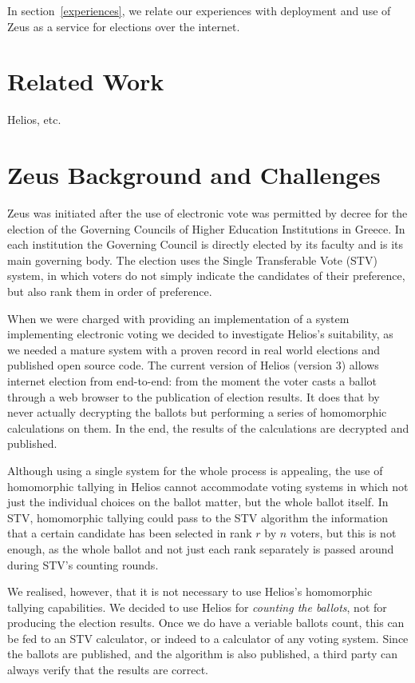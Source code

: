 \documentclass[letterpaper,twocolumn,10pt]{article}
\begin{document}
In section~\ref{experiences},
we relate our experiences with deployment and use of Zeus as a service
for elections over the internet.

\section{Related Work}
\label{related}

Helios, etc.

\section{Zeus Background and Challenges}
\label{challenges}
Zeus was initiated after the use of electronic vote was permitted by
decree for the election of the Governing Councils of Higher Education
Institutions in Greece. In each institution the Governing Council is
directly elected by its faculty and is its main governing body. The
election uses the Single Transferable Vote (STV) system, in which
voters do not simply indicate the candidates of their preference, but
also rank them in order of preference. 

When we were charged with providing an implementation of a system
implementing electronic voting we decided to investigate Helios's
suitability, as we needed a mature system with a proven record in real
world elections and published open source code. The current version of
Helios (version 3) allows internet election from end-to-end: from the
moment the voter casts a ballot through a web browser to the
publication of election results. It does that by never actually
decrypting the ballots but performing a series of homomorphic
calculations on them. In the end, the results of the calculations are
decrypted and published. 

Although using a single system for the whole process is appealing, the
use of homomorphic tallying in Helios cannot accommodate voting
systems in which not just the individual choices on the ballot matter,
but the whole ballot itself. In STV, homomorphic tallying could pass
to the STV algorithm the information that a certain candidate has been
selected in rank $r$ by $n$ voters, but this is not enough, as the whole
ballot and not just each rank separately is passed around during STV's
counting rounds.

We realised, however, that it is not necessary to use Helios's
homomorphic tallying capabilities. We decided to use Helios for
\emph{counting the ballots}, not for producing the election results.
Once we do have a veriable ballots count, this can be fed to an STV
calculator, or indeed to a calculator of any voting system. Since the
ballots are published, and the algorithm is also published, a third
party can always verify that the results are correct.
\end{document}
